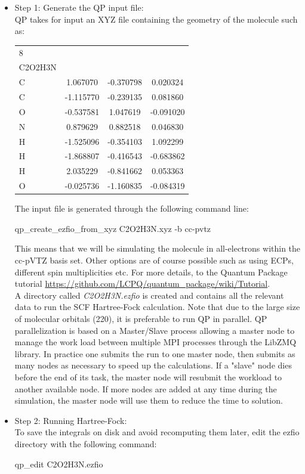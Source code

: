 \begin{itemize}
\item Step 1: Generate the QP input file:\\
QP takes for input an XYZ file containing the geometry of the molecule such as:

\begin{center}
\begin{tabular}{ l c c c }
8\\
C2O2H3N\\
C &       1.067070 &  -0.370798 &   0.020324\\
C &      -1.115770 &  -0.239135 &   0.081860\\
O &      -0.537581 &   1.047619 &  -0.091020\\
N &       0.879629 &   0.882518 &   0.046830\\
H &      -1.525096 &  -0.354103 &   1.092299\\
H &      -1.868807 &  -0.416543 &  -0.683862\\
H &       2.035229 &  -0.841662 &   0.053363\\
O &      -0.025736 &  -1.160835 &  -0.084319   
\end{tabular}
\end{center}

The input file is generated through the following command line:\\

\begin{shade}
qp_create_ezfio_from_xyz C2O2H3N.xyz -b cc-pvtz 
\end{shade}

 
This means that we will be simulating the molecule in all-electrons within the cc-pVTZ basis set. Other options are of course possible such as using ECPs, different spin multiplicities etc. For more details, to the Quantum Package tutorial \url{https://github.com/LCPQ/quantum_package/wiki/Tutorial}.\\
A directory called \textit{C2O2H3N.ezfio} is created and contains all the relevant data to run the SCF Hartree-Fock calculation. Note that due to the large size of molecular orbitals (220), it is preferable to run QP in parallel. QP parallelization is based on a Master/Slave process allowing a master node to manage the work load between multiple MPI processes through the LibZMQ library. In practice one submits the run to one master node, then submits as many nodes as necessary to speed up the calculations. If a "slave" node dies before the end of its task, the master node will resubmit the workload to another available node. If more nodes are added at any time during the simulation, the master node will use them to reduce the time to solution.\\
\item Step 2: Running Hartree-Fock:\\
To save the integrals on disk and avoid recomputing them later, edit the ezfio directory with the following command:\\
\begin{shade}
qp_edit C2O2H3N.ezfio 
\end{shade}


\end{itemize}
